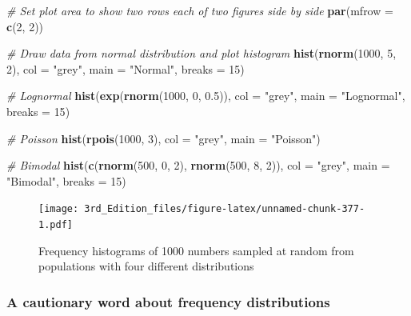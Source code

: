 \documentclass[
]{book}
\newenvironment{Shaded}{\begin{snugshade}}{\end{snugshade}}
\newcommand{\CommentTok}[1]{\textcolor[rgb]{0.56,0.35,0.01}{\textit{#1}}}
\newcommand{\DataTypeTok}[1]{\textcolor[rgb]{0.13,0.29,0.53}{#1}}
\newcommand{\DecValTok}[1]{\textcolor[rgb]{0.00,0.00,0.81}{#1}}
\newcommand{\FloatTok}[1]{\textcolor[rgb]{0.00,0.00,0.81}{#1}}
\newcommand{\KeywordTok}[1]{\textcolor[rgb]{0.13,0.29,0.53}{\textbf{#1}}}
\newcommand{\NormalTok}[1]{#1}
\newcommand{\StringTok}[1]{\textcolor[rgb]{0.31,0.60,0.02}{#1}}
\begin{document}
\begin{Shaded}
\begin{Highlighting}[]
\CommentTok{# Set plot area to show two rows each of two figures side by side}
\KeywordTok{par}\NormalTok{(}\DataTypeTok{mfrow =} \KeywordTok{c}\NormalTok{(}\DecValTok{2}\NormalTok{, }\DecValTok{2}\NormalTok{))}

\CommentTok{# Draw data from normal distribution and plot histogram}
\KeywordTok{hist}\NormalTok{(}\KeywordTok{rnorm}\NormalTok{(}\DecValTok{1000}\NormalTok{, }\DecValTok{5}\NormalTok{, }\DecValTok{2}\NormalTok{),}
     \DataTypeTok{col =} \StringTok{"grey"}\NormalTok{,}
     \DataTypeTok{main =} \StringTok{"Normal"}\NormalTok{,}
     \DataTypeTok{breaks =} \DecValTok{15}\NormalTok{)}

\CommentTok{# Lognormal}
\KeywordTok{hist}\NormalTok{(}\KeywordTok{exp}\NormalTok{(}\KeywordTok{rnorm}\NormalTok{(}\DecValTok{1000}\NormalTok{, }\DecValTok{0}\NormalTok{, }\FloatTok{0.5}\NormalTok{)),}
     \DataTypeTok{col =} \StringTok{"grey"}\NormalTok{,}
     \DataTypeTok{main =} \StringTok{"Lognormal"}\NormalTok{,}
     \DataTypeTok{breaks =} \DecValTok{15}\NormalTok{)}

\CommentTok{# Poisson}
\KeywordTok{hist}\NormalTok{(}\KeywordTok{rpois}\NormalTok{(}\DecValTok{1000}\NormalTok{, }\DecValTok{3}\NormalTok{), }
     \DataTypeTok{col =} \StringTok{"grey"}\NormalTok{, }
     \DataTypeTok{main =} \StringTok{"Poisson"}\NormalTok{)}

\CommentTok{# Bimodal}
\KeywordTok{hist}\NormalTok{(}\KeywordTok{c}\NormalTok{(}\KeywordTok{rnorm}\NormalTok{(}\DecValTok{500}\NormalTok{, }\DecValTok{0}\NormalTok{, }\DecValTok{2}\NormalTok{), }\KeywordTok{rnorm}\NormalTok{(}\DecValTok{500}\NormalTok{, }\DecValTok{8}\NormalTok{, }\DecValTok{2}\NormalTok{)),}
     \DataTypeTok{col =} \StringTok{"grey"}\NormalTok{,}
     \DataTypeTok{main =} \StringTok{"Bimodal"}\NormalTok{,}
     \DataTypeTok{breaks =} \DecValTok{15}\NormalTok{)}
\end{Highlighting}
\end{Shaded}

\begin{figure}
\centering
\texttt{[image: 3rd\_Edition\_files/figure-latex/unnamed-chunk-377-1.pdf]}
\caption{\label{fig:unnamed-chunk-377}Frequency histograms of 1000 numbers sampled at random from populations with four different distributions}
\end{figure}

\hypertarget{a-cautionary-word-about-frequency-distributions}{%
\subsubsection{A cautionary word about frequency distributions}\label{a-cautionary-word-about-frequency-distributions}}
\end{document}
